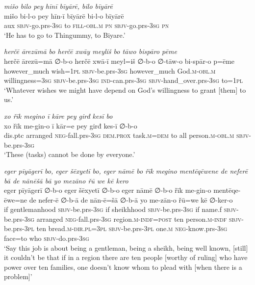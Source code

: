 \ea \label{ŠJ.78}
\textit{mišo bilo pey hīnī bīyārē, bilo bīyārē} \\ 
\gll mišo bi-l-o pey hīn-ī bīyārē bi-l-o bīyārē \\ 
 aux \textsc{sbjv-}go.prs\textsc{-3sg} to \textsc{fill}\textsc{-obl}\textsc{.m} \textsc{pn} \textsc{sbjv-}go.prs\textsc{-3sg} \textsc{pn} \\ 
\glt `He has to go to Thingummy, to Biyare.'
\z 
 
\ea \label{ŠJ.89}
\textit{herčē ārezūmā bo herčē xwāy meyliš bo tāwo bispāro pēme} \\ 
\gll herčē ārezū=mā ∅-b-o herčē xwā-ī meyl=iš ∅-b-o ∅-tāw-o bi-spār-o p=ēme \\ 
 however\_much wish\textsc{=\textsc{1pl}} \textsc{sbjv-}be.prs\textsc{-3sg} however\_much God\textsc{.m}\textsc{-obl}\textsc{.m} willingness\textsc{=3sg} \textsc{sbjv-}be.prs\textsc{-3sg} \textsc{ind-}can.prs\textsc{-3sg} \textsc{sbjv-}hand\_over.prs\textsc{-3sg} to=\textsc{1pl} \\ 
\glt `Whatever wishes we might have depend on God’s willingness to grant [them] to us.'
\z 
 
\ea \label{ŠJ.90}
\textit{xo řīk megino ī kāre pey girđ kesī bo} \\ 
\gll xo řīk me-gin-o ī kār=e pey girđ kes-ī ∅-b-o \\ 
 dis.ptc arranged \textsc{neg-}fall.prs\textsc{-3sg} \textsc{dem.prox} task\textsc{.m}\textsc{=dem} to all person\textsc{.m}\textsc{-obl}\textsc{.m} \textsc{sbjv-}be.prs\textsc{-3sg} \\ 
\glt `These (tasks) cannot be done by everyone.'
\z 
 
\ea \label{ŠJ.91}
\textit{eger pīyāgerī bo, eger šēxyetī bo, eger nāmē bo řīk megino mentēqēwene de neferē bā de nānēšā bā yo mezāno řū we kē kero} \\ 
\gll eger pīyāgerī ∅-b-o eger šēxyetī ∅-b-o eger nāmē ∅-b-o řīk me-gin-o mentēqe-ēwe=ne de nefer-ē ∅-b-ā de nān-ē=šā ∅-b-ā yo me-zān-o řū=we kē ∅-ker-o \\ 
 if gentlemanhood \textsc{sbjv-}be.prs\textsc{-3sg} if sheikhhood \textsc{sbjv-}be.prs\textsc{-3sg} if name.f \textsc{sbjv-}be.prs\textsc{-3sg} arranged \textsc{neg-}fall.prs\textsc{-3sg} region\textsc{.m}\textsc{-indf}\textsc{=\textsc{post}} ten person\textsc{.m}\textsc{-indf} \textsc{sbjv-}be.prs\textsc{-3pl} ten bread\textsc{.m}\textsc{-dir}\textsc{.pl}\textsc{=3pl} \textsc{sbjv-}be.prs\textsc{-3pl} one\textsc{.m} \textsc{neg-}know.prs\textsc{-3sg} face=to who \textsc{sbjv-}do.prs\textsc{-3sg} \\ 
\glt `Say this job is about being a gentleman, being a sheikh, being well known, [still] it couldn’t be that if in a region there are ten people [worthy of ruling] who have power over ten families, one doesn’t know whom to plead with [when there is a problem]'
\z 
 
